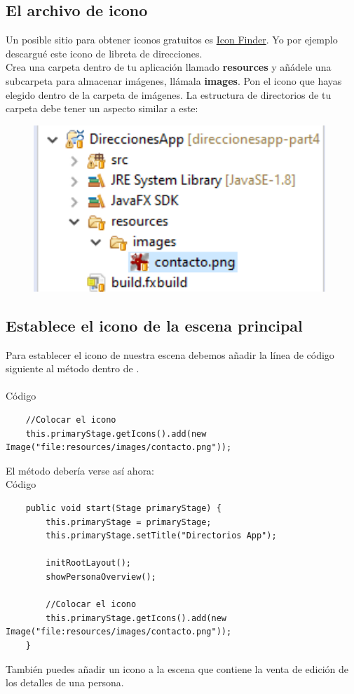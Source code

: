 \subsection{El archivo de icono}
Un posible sitio para obtener iconos gratuitos es \textcolor{azul}{\href{https://www.iconfinder.com/}{Icon Finder}}. %
Yo por ejemplo descargué este icono de libreta de direcciones.\\
Crea una carpeta dentro de tu aplicación llamado \textbf{resources} y añádele una subcarpeta 
para almacenar imágenes, llámala \textbf{images}. Pon el icono que hayas elegido dentro de la 
carpeta de imágenes. La estructura de directorios de tu carpeta debe tener un aspecto similar a este:
\begin{figure}[H]
	\includegraphics[width=11cm]{img/6-12-selectIcon.png}
\end{figure}
\subsection{Establece el icono de la escena principal}
Para establecer el icono de nuestra escena debemos añadir la línea de 
código siguiente al método  dentro de .\\
\\
Código
\begin{verbatim}
    //Colocar el icono
	this.primaryStage.getIcons().add(new Image("file:resources/images/contacto.png"));
\end{verbatim}
El método  debería verse así ahora:\\
Código
\begin{verbatim}
    public void start(Stage primaryStage) {
		this.primaryStage = primaryStage;
		this.primaryStage.setTitle("Directorios App");

		initRootLayout();
		showPersonaOverview();

		//Colocar el icono
		this.primaryStage.getIcons().add(new Image("file:resources/images/contacto.png"));
	}
\end{verbatim}
También puedes añadir un icono a la escena que contiene la venta de edición de los detalles de una persona.